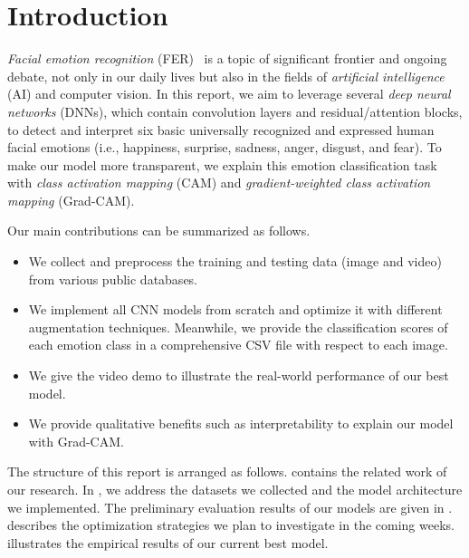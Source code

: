 \section{Introduction}
\label{sec:intro}

\textit{Facial emotion recognition} (FER)~\cite{Ko18,JainSS19} is a topic of significant frontier and ongoing debate, 
not only in our daily lives but also in the fields of \textit{artificial intelligence} (AI) and computer vision.
In this report, we aim to leverage several \textit{deep neural networks} (DNNs), 
which contain convolution layers and residual/attention blocks, 
to detect and interpret six basic universally recognized and expressed human facial emotions 
(i.e., happiness, surprise, sadness, anger, disgust, and fear). 
To make our model more transparent, 
we explain this emotion classification task with \textit{class activation mapping} (CAM) 
and \textit{gradient-weighted class activation mapping} (Grad-CAM). 

Our main contributions can be summarized as follows.
\begin{itemize}
  \item We collect and preprocess the training and testing data (image and video) from various public databases. 
  \item We implement all CNN models from scratch and optimize it with different augmentation techniques. 
  Meanwhile, we provide the classification scores of each emotion class in a comprehensive CSV file with respect to each image. 
  \item We give the video demo to illustrate the real-world performance of our best model.
  \item We provide qualitative benefits such as interpretability to explain our model with Grad-CAM. 
\end{itemize}

The structure of this report is arranged as follows. 
 contains the related work of our research. 
In , 
we address the datasets we collected and the model architecture we implemented. 
The preliminary evaluation results of our models are given in . 
 describes the optimization strategies we plan to investigate in the coming weeks. 
 illustrates the empirical results of our current best model. 


